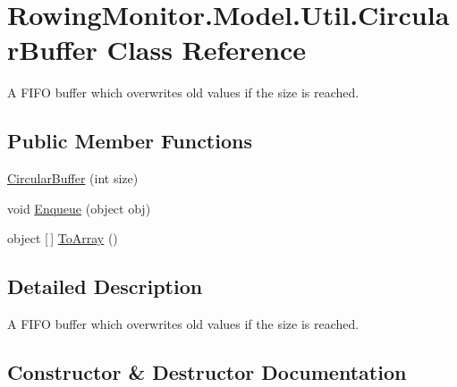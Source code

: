 \hypertarget{class_rowing_monitor_1_1_model_1_1_util_1_1_circular_buffer}{}\section{Rowing\+Monitor.\+Model.\+Util.\+Circular\+Buffer Class Reference}
\label{class_rowing_monitor_1_1_model_1_1_util_1_1_circular_buffer}


A F\+I\+FO buffer which overwrites old values if the size is reached.  


\subsection*{Public Member Functions}
\begin{DoxyCompactItemize}
\item 
\hyperlink{class_rowing_monitor_1_1_model_1_1_util_1_1_circular_buffer_a733322a69fc230d62c34e7704c0b63b1}{Circular\+Buffer} (int size)
\item 
void \hyperlink{class_rowing_monitor_1_1_model_1_1_util_1_1_circular_buffer_af301723b675ac785291d5d234c5557c7}{Enqueue} (object obj)
\item 
object \mbox{[}$\,$\mbox{]} \hyperlink{class_rowing_monitor_1_1_model_1_1_util_1_1_circular_buffer_a63e22497a191f7a4352e5aed13ce7e4a}{To\+Array} ()
\end{DoxyCompactItemize}


\subsection{Detailed Description}
A F\+I\+FO buffer which overwrites old values if the size is reached. 



\subsection{Constructor \& Destructor Documentation}
\mbox{\label{class_rowing_monitor_1_1_model_1_1_util_1_1_circular_buffer_a733322a69fc230d62c34e7704c0b63b1}} 
